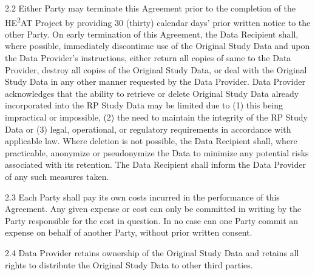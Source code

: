2.2 Either Party may terminate this Agreement prior to the completion of the HE\textsuperscript{2}AT Project by providing 30 (thirty) calendar days' prior written notice to the other Party. On early termination of this Agreement, the Data Recipient shall, where possible, immediately discontinue use of the Original Study Data and upon the Data Provider's instructions, either return all copies of same to the Data Provider, destroy all copies of the Original Study Data, or deal with the Original Study Data in any other manner requested by the Data Provider. Data Provider acknowledges that the ability to retrieve or delete Original Study Data already incorporated into the RP Study Data may be limited due to (1) this being impractical or impossible, (2) the need to maintain the integrity of the RP Study Data or (3) legal, operational, or regulatory requirements in accordance with applicable law. Where deletion is not possible, the Data Recipient shall, where practicable, anonymize or pseudonymize the Data to minimize any potential risks associated with its retention. The Data Recipient shall inform the Data Provider of any such measures taken.

2.3 Each Party shall pay its own costs incurred in the performance of this Agreement. Any given expense or cost can only be committed in writing by the Party responsible for the cost in question. In no case can one Party commit an expense on behalf of another Party, without prior written consent.

2.4 Data Provider retains ownership of the Original Study Data and retains all rights to distribute the Original Study Data to other third parties. 

